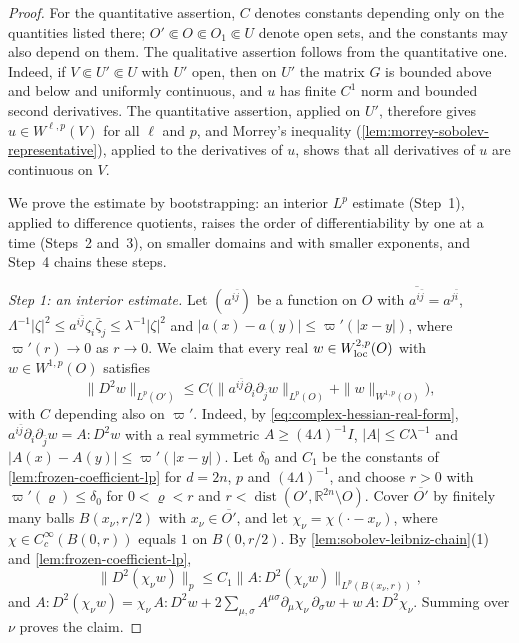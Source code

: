 \begin{proof}
For the quantitative assertion, $C$ denotes constants depending only on the quantities listed there; $O'\Subset O\Subset O_1\Subset U$ denote open sets, and the constants may also depend on them. The qualitative assertion follows from the quantitative one. Indeed, if $V\Subset U'\Subset U$ with $U'$ open, then on $U'$ the matrix $G$ is bounded above and below and uniformly continuous, and $u$ has finite $C^1$ norm and bounded second derivatives. The quantitative assertion, applied on $U'$, therefore gives $u\in W^{\ell,p}(V)$ for all $\ell$ and $p$, and Morrey's inequality (\cref{lem:morrey-sobolev-representative}), applied to the derivatives of $u$, shows that all derivatives of $u$ are continuous on $V$.

We prove the estimate by bootstrapping: an interior $L^p$ estimate (Step~1), applied to difference quotients, raises the order of differentiability by one at a time (Steps~2 and~3), on smaller domains and with smaller exponents, and Step~4 chains these steps.

\emph{Step 1: an interior estimate.} Let $(a^{i\bar j})$ be a function on $O$ with $\overline{a^{i\bar j}}=a^{j\bar i}$, $\Lambda^{-1}|\zeta|^2\leq a^{i\bar j}\zeta_i\bar\zeta_j\leq\lambda^{-1}|\zeta|^2$ and $|a(x)-a(y)|\leq\varpi'(|x-y|)$, where $\varpi'(r)\to0$ as $r\to0$. We claim that every real $w\in W^{2,p}_{\mathrm{loc}}(O)$ with $w\in W^{1,p}(O)$ satisfies
\[
 \|D^2w\|_{L^p(O')}\leq C\bigl(\|a^{i\bar j}\partial_i\partial_{\bar j}w\|_{L^p(O)}+\|w\|_{W^{1,p}(O)}\bigr),
\]
with $C$ depending also on $\varpi'$. Indeed, by \eqref{eq:complex-hessian-real-form}, $a^{i\bar j}\partial_i\partial_{\bar j}w=A:D^2w$ with a real symmetric $A\geq(4\Lambda)^{-1}I$, $|A|\leq C\lambda^{-1}$ and $|A(x)-A(y)|\leq\varpi'(|x-y|)$. Let $\delta_0$ and $C_1$ be the constants of \cref{lem:frozen-coefficient-lp} for $d=2n$, $p$ and $(4\Lambda)^{-1}$, and choose $r>0$ with $\varpi'(\varrho)\leq\delta_0$ for $0<\varrho<r$ and $r<\operatorname{dist}(O',\mathbb R^{2n}\setminus O)$. Cover $\overline{O'}$ by finitely many balls $B(x_\nu,r/2)$ with $x_\nu\in\overline{O'}$, and let $\chi_\nu=\chi(\cdot-x_\nu)$, where $\chi\in C_c^\infty(B(0,r))$ equals $1$ on $B(0,r/2)$. By \cref{lem:sobolev-leibniz-chain}(1) and \cref{lem:frozen-coefficient-lp},
\[
 \|D^2(\chi_\nu w)\|_p\leq C_1\|A:D^2(\chi_\nu w)\|_{L^p(B(x_\nu,r))},
\]
and $A:D^2(\chi_\nu w)=\chi_\nu\,A:D^2w+2\sum_{\mu,\sigma}A^{\mu\sigma}\partial_\mu\chi_\nu\,\partial_\sigma w+w\,A:D^2\chi_\nu$. Summing over $\nu$ proves the claim.


\end{proof}
